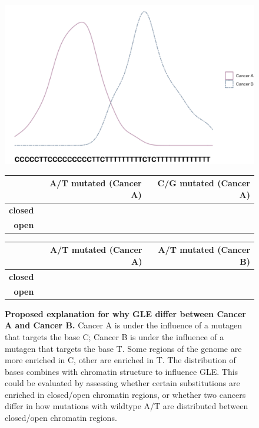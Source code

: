 \begin{figure}[h!]
  \begin{minipage}[c]{\textwidth}
    \includegraphics[scale=0.9]{graphics/discussion_gle.pdf}
  \end{minipage}\hfill
  \vspace{1cm}
  
  \begin{minipage}[c]{0.48\textwidth}
  \centering
    \begin{tabulary}{\columnwidth}{rRR}
    \toprule
        & \textbf{A/T mutated (Cancer A)} &  \textbf{C/G mutated (Cancer A)} \\
    \hline
        \textbf{closed} &  &   \\
        \textbf{open} &  &   \\
    \bottomrule
    \end{tabulary}
  \end{minipage}\hfill
  \begin{minipage}[c]{0.48\textwidth}
    \begin{tabulary}{\columnwidth}{rRR}
    \toprule
        & \textbf{A/T mutated (Cancer A)} &  \textbf{A/T mutated (Cancer B)} \\
    \hline
        \textbf{closed} &  &   \\
        \textbf{open} &  &   \\
    \bottomrule
    \end{tabulary}
  \end{minipage}
  \vspace{0.5cm}
  
  \begin{minipage}[c]{\textwidth}
    \caption{
      \textbf{Proposed explanation for why GLE differ between Cancer A and Cancer B.} Cancer A is under the influence of a mutagen that targets the base C; Cancer B is under the influence of a mutagen that targets the base T. Some regions of the genome are more enriched in C, other are enriched in T. The distribution of bases combines with chromatin structure to influence GLE. This could be evaluated by assessing whether certain substitutions are enriched in closed/open chromatin regions, or whether two cancers differ in how mutations with wildtype A/T are distributed between closed/open chromatin regions.
    } \label{fig:discussion_gle}
  \end{minipage}
\end{figure}

